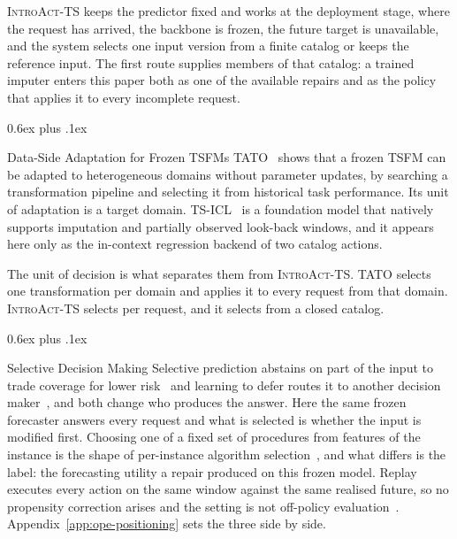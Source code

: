 \documentclass{article}
\makeatletter
\newcommand{\introact}{\textsc{IntroAct-TS}}
\newcommand{\tsfm}{TSFM}
\def\subsection{\@startsection{subsection}{2}{\z@}{-1.4ex plus -0.4ex minus -.2ex}%
  {0.6ex plus .1ex}{\normalsize\sc\raggedright}}
\makeatother
\begin{document}
\introact{} keeps the predictor fixed and works at the deployment stage, where the request has
arrived, the backbone is frozen, the future target is unavailable, and the system selects one
input version from a finite catalog or keeps the reference input. The first route supplies
members of that catalog: a trained imputer enters this paper both as one of the available
repairs and as the policy that applies it to every incomplete request.

\subsection{Data-Side Adaptation for Frozen \tsfm{}s}
\label{sec:related-dataside}
TATO~\citep{qiu2026tato} shows that a frozen \tsfm{} can be adapted to heterogeneous domains
without parameter updates, by searching a transformation pipeline and selecting it from
historical task performance. Its unit of adaptation is a target domain.
TS-ICL~\citep{tsicl2026} is a foundation model that natively supports imputation and partially
observed look-back windows, and it appears here only as the in-context regression backend of
two catalog actions.

The unit of decision is what separates them from \introact{}. TATO selects one transformation
per domain and applies it to every request from that domain. \introact{} selects per request,
and it selects from a closed catalog.

\subsection{Selective Decision Making}
\label{sec:related-selective}
Selective prediction abstains on part of the input to trade coverage for lower
risk~\citep{chow1970optimum,vovk2005algorithmic,geifman2017selective,lei2018distribution} and
learning to defer routes it to another decision maker~\citep{madras2018predict,
mozannar2020consistent}, and both change who produces the answer. Here the same frozen
forecaster answers every request and what is selected is whether the input is modified first.
Choosing one of a fixed set of procedures from features of the instance is the shape of
per-instance algorithm selection~\citep{rice1976algorithm,xu2008satzilla}, and what differs is
the label: the forecasting utility a repair produced on this frozen model. Replay executes
every action on the same window against the same realised future, so no propensity correction
arises and the setting is not off-policy
evaluation~\citep{dudik2011doubly,swaminathan2015counterfactual}.
Appendix~\ref{app:ope-positioning} sets the three side by side.
\end{document}
